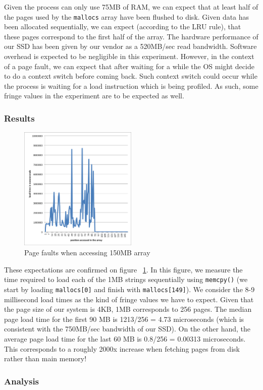Given the process can only use 75MB of RAM, we can expect that at least half of the pages used by the \texttt{mallocs} array have been flushed to disk. Given data has been allocated sequentially, we can expect (according to the LRU rule), that these pages correspond to the first half of the array. The hardware performance of our SSD has been given by our vendor as a 520MB/sec read bandwidth. Software overhead is expected to be negligible in this experiment. However, in the context of a page fault, we can expect that after waiting for a while the OS might decide to do a context switch before coming back. Such context switch could occur while the process is waiting for a load instruction which is being profiled. As such, some fringe values in the experiment are to be expected as well.

\subsubsection{Results}

\begin{figure}
 \centering
  \includegraphics[width=0.5\textwidth]{image/pagefault.png}
  \caption{Page faults when accessing 150MB array}
 \label{fig:pagefault}
\end{figure}

These expectations are confirmed on figure ~\ref{fig:pagefault}. In this figure, we measure the time required to load each of the 1MB strings sequentially using \texttt{memcpy()} (we start by loading \texttt{mallocs[0]} and finish with \texttt{mallocs[149]}). We consider the 8-9 millisecond load times as the kind of fringe values we have to expect.
Given that the page size of our system is 4KB, 1MB corresponds to 256 pages. The median page load time for the first 90 MB is 1213/256 = 4.73  microseconds (which is consistent with the 750MB/sec bandwidth of our SSD). On the other hand, the average page load time for the last 60 MB is 0.8/256 = 0.00313  microseconds. This corresponds to a roughly 2000x increase when fetching pages from disk rather than main memory!

\subsubsection{Analysis}